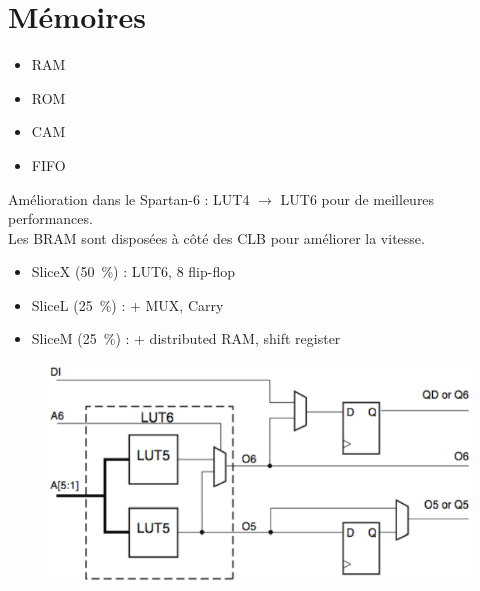 \documentclass[resume]{subfiles}
\begin{document}
\section{Mémoires}
\begin{itemize}
\item RAM
\item ROM
\item CAM
\item FIFO
\end{itemize}
Amélioration dans le Spartan-6 : LUT4 $\rightarrow$ LUT6 pour de meilleures performances.\\
Les BRAM sont disposées à côté des CLB pour améliorer la vitesse.
\begin{itemize}
\item SliceX (\SI{50}{\percent}) : LUT6, 8 flip-flop
\item SliceL (\SI{25}{\percent}) : + MUX, Carry
\item SliceM (\SI{25}{\percent}) : + distributed RAM, shift register
\end{itemize}
\begin{figure}[H]
\centering
\includegraphics[width=0.6\columnwidth]{img_0.png}
\end{figure}
\end{document}
